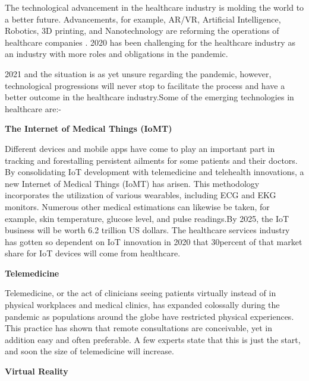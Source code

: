 \documentclass[12pt,a4paper]{report}
\begin{document}
The technological advancement in the healthcare industry is molding the world to a better future. Advancements, for example, AR/VR, Artificial Intelligence, Robotics, 3D printing, and Nanotechnology are reforming the operations of healthcare companies . 2020 has been challenging for the healthcare industry as an industry with more roles and obligations in the pandemic.\par

2021 and the situation is as yet unsure regarding the pandemic, however,  technological progressions will never stop to facilitate the process and have a better outcome in the healthcare industry.Some of the emerging technologies in healthcare are:- \par

\begin{center}
  \small{\textbf{The Internet of Medical Things (IoMT)}}
\end{center}

Different devices and mobile apps have come to play an important part in tracking and forestalling persistent ailments for some patients and their doctors. By consolidating IoT development with telemedicine and telehealth innovations, a new Internet of Medical Things (IoMT) has arisen. This methodology incorporates the utilization of various wearables, including ECG and EKG monitors. Numerous other medical estimations can likewise be taken, for example, skin temperature, glucose level, and pulse readings.By 2025, the IoT business will be worth 6.2 trillion US dollars. The healthcare services industry has gotten so dependent on IoT innovation in 2020 that 30percent of that market share for IoT devices will come from healthcare.\par

\begin{center}
  \small{\textbf{Telemedicine}}
\end{center}

Telemedicine, or the act of clinicians seeing patients virtually instead of in physical workplaces and medical clinics, has expanded colossally during the pandemic as populations around the globe have restricted physical experiences. This practice has shown that remote consultations are conceivable, yet in addition easy and often preferable. A few experts state that this is just the start, and soon the size of telemedicine will increase.\par


\begin{center}
  \small{\textbf{Virtual Reality}}
\end{center}
\end{document}
